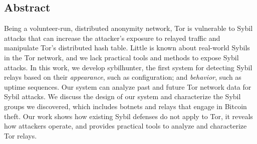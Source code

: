 \subsection*{Abstract}
Being a volunteer-run, distributed anonymity network, Tor is vulnerable to Sybil
attacks that can increase the attacker's exposure to relayed traffic and
manipulate Tor's distributed hash table.  Little is known about real-world
Sybils in the Tor network, and we lack practical tools and methods to expose
Sybil attacks.
%
In this work, we develop sybilhunter, the first system for detecting Sybil
relays based on their \emph{appearance}, such as configuration; and
\emph{behavior}, such as uptime sequences.  Our system can analyze past and
future Tor network data for Sybil attacks.  We discuss the design of our system
and characterize the Sybil groups we discovered, which includes botnets and
relays that engage in Bitcoin theft.
%
Our work shows how existing Sybil defenses do not apply to Tor, it reveals how
attackers operate, and provides practical tools to analyze and characterize Tor
relays.
